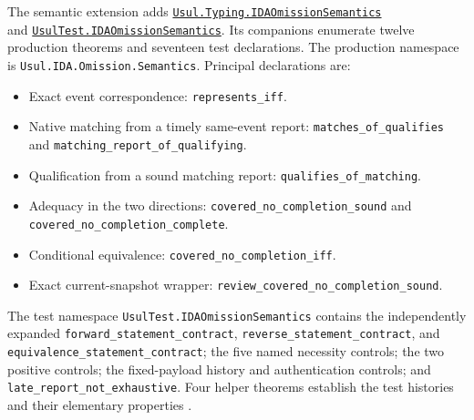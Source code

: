 \documentclass[11pt]{article}
\begin{document}
The semantic extension adds \href{https://github.com/larsbx/usul-al-fiqh-deontic-circuits/blob/784af396db0241c8c83da096d060740c93f4ff1d/formal/lean/Usul/Typing/IDAOmissionSemantics.lean}{\texttt{Usul.\allowbreak{}Typing.\allowbreak{}IDAOmissionSemantics}}\\
and \href{https://github.com/larsbx/usul-al-fiqh-deontic-circuits/blob/784af396db0241c8c83da096d060740c93f4ff1d/formal/lean/UsulTest/IDAOmissionSemantics.lean}{\texttt{UsulTest.\allowbreak{}IDAOmissionSemantics}}. Its companions enumerate twelve production theorems and seventeen test declarations. The production namespace is \texttt{Usul.\allowbreak{}IDA.\allowbreak{}Omission.\allowbreak{}Semantics}. Principal declarations are:
\begin{itemize}
\item Exact event correspondence: \texttt{represents\_iff}.
\item Native matching from a timely same-event report: \texttt{matches\_of\_qualifies} and \texttt{matching\_\allowbreak{}report\_\allowbreak{}of\_\allowbreak{}qualifying}.
\item Qualification from a sound matching report: \texttt{qualifies\_of\_matching}.
\item Adequacy in the two directions: \texttt{covered\_\allowbreak{}no\_\allowbreak{}completion\_\allowbreak{}sound} and \texttt{covered\_\allowbreak{}no\_\allowbreak{}completion\_\allowbreak{}complete}.
\item Conditional equivalence: \texttt{covered\_\allowbreak{}no\_\allowbreak{}completion\_\allowbreak{}iff}.
\item Exact current-snapshot wrapper: \texttt{review\_\allowbreak{}covered\_\allowbreak{}no\_\allowbreak{}completion\_\allowbreak{}sound}.
\end{itemize}
The test namespace \texttt{UsulTest.\allowbreak{}IDAOmissionSemantics} contains the independently expanded \texttt{forward\_\allowbreak{}statement\_\allowbreak{}contract}, \texttt{reverse\_\allowbreak{}statement\_\allowbreak{}contract}, and \texttt{equivalence\_\allowbreak{}statement\_\allowbreak{}contract}; the five named necessity controls; the two positive controls; the fixed-payload history and authentication controls; and \texttt{late\_\allowbreak{}report\_\allowbreak{}not\_\allowbreak{}exhaustive}. Four helper theorems establish the test histories and their elementary properties \cite{omission-semantics}.
\end{document}
